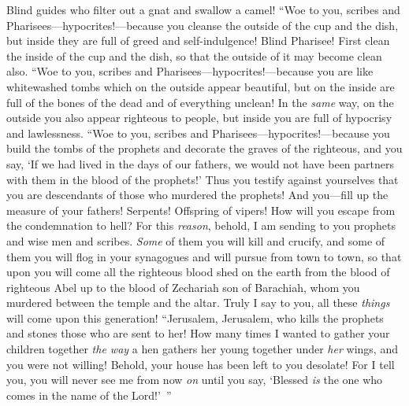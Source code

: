 \begin{biblechapter}
\verse Blind guides who filter out a gnat and swallow a camel!
\verse “Woe to you, scribes and Pharisees—hypocrites!—because you cleanse the outside of the cup and the dish, but inside they are full of greed and self-indulgence!
\verse Blind Pharisee! First clean the inside of the cup and the dish, so that the outside of it may become clean also.
\verse “Woe to you, scribes and Pharisees—hypocrites!—because you are like whitewashed tombs which on the outside appear beautiful, but on the inside are full of the bones of the dead and of everything unclean!
\verse In the \textit{same} way, on the outside you also appear righteous to people, but inside you are full of hypocrisy and lawlessness.
\verse “Woe to you, scribes and Pharisees—hypocrites!—because you build the tombs of the prophets and decorate the graves of the righteous,
\verse and you say, ‘If we had lived in the days of our fathers, we would not have been partners with them in the blood of the prophets!’
\verse Thus you testify against yourselves that you are descendants of those who murdered the prophets!
\verse And you—fill up the measure of your fathers!
\verse Serpents! Offspring of vipers! How will you escape from the condemnation to hell?
\verse For this \textit{reason}, behold, I am sending to you prophets and wise men and scribes. \textit{Some} of them you will kill and crucify, and some of them you will flog in your synagogues and will pursue from town to town,
\verse so that upon you will come all the righteous blood shed on the earth from the blood of righteous Abel up to the blood of Zechariah son of Barachiah, whom you murdered between the temple and the altar.
\verse Truly I say to you, all these \textit{things} will come upon this generation!
 “Jerusalem, Jerusalem, who kills the prophets and stones those who are sent to her! How many times I wanted to gather your children together \textit{the way} a hen gathers her young together under \textit{her} wings, and you were not willing!
\verse Behold, your house has been left to you desolate!
\verse For I tell you, you will never see me from now \textit{on} until you say, ‘Blessed \textit{is} the one who comes in the name of the Lord!’ ”
\end{biblechapter}

